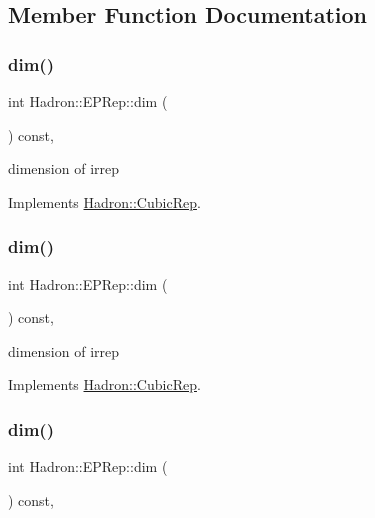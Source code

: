 \subsection{Member Function Documentation}
\mbox{\label{structHadron_1_1EPRep_a79d6baee5b8e9548d0b5729f854368c5}} 
\subsubsection{\texorpdfstring{dim()}{dim()}\hspace{0.1cm}{\footnotesize\ttfamily [1/3]}}
{\footnotesize\ttfamily int Hadron\+::\+E\+P\+Rep\+::dim (\begin{DoxyParamCaption}{ }\end{DoxyParamCaption}) const\hspace{0.3cm}{\ttfamily [inline]}, {\ttfamily [virtual]}}

dimension of irrep 

Implements \mbox{\hyperlink{structHadron_1_1CubicRep_ac178d14064f037a66af4b9fb4b312d51}{Hadron\+::\+Cubic\+Rep}}.

\mbox{\label{structHadron_1_1EPRep_a79d6baee5b8e9548d0b5729f854368c5}} 
\subsubsection{\texorpdfstring{dim()}{dim()}\hspace{0.1cm}{\footnotesize\ttfamily [2/3]}}
{\footnotesize\ttfamily int Hadron\+::\+E\+P\+Rep\+::dim (\begin{DoxyParamCaption}{ }\end{DoxyParamCaption}) const\hspace{0.3cm}{\ttfamily [inline]}, {\ttfamily [virtual]}}

dimension of irrep 

Implements \mbox{\hyperlink{structHadron_1_1CubicRep_ac178d14064f037a66af4b9fb4b312d51}{Hadron\+::\+Cubic\+Rep}}.

\mbox{\label{structHadron_1_1EPRep_a79d6baee5b8e9548d0b5729f854368c5}} 
\subsubsection{\texorpdfstring{dim()}{dim()}\hspace{0.1cm}{\footnotesize\ttfamily [3/3]}}
{\footnotesize\ttfamily int Hadron\+::\+E\+P\+Rep\+::dim (\begin{DoxyParamCaption}{ }\end{DoxyParamCaption}) const\hspace{0.3cm}{\ttfamily [inline]}, {\ttfamily [virtual]}}

